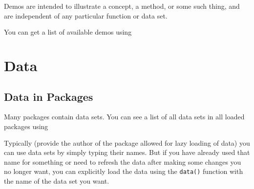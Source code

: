 Demos are intended to illustrate a concept, a method, or some such thing, and are 
independent of any particular function or data set.

You can get a list of available demos using

\begin{knitrout}
\end{knitrout}



\section{Data}
\subsection{Data in Packages}
Many packages contain data sets.  You can see a list of all data sets in all loaded packages
using 

\begin{knitrout}
\end{knitrout}


Typically (provide the author of the package allowed for lazy loading of data) 
you can use data sets by simply typing their names.  But if you have already
used that name for something or need to refresh the data after making some changes you no longer
want, you can explicitly load the data using the \verb!data()! function with the name of the 
data set you want.

